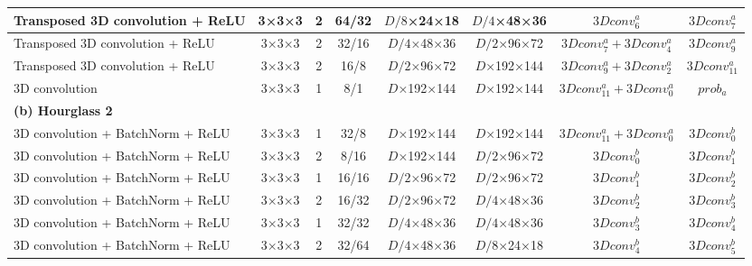 \begin{table}[htbp]
\begin{adjustbox}{width=1\textwidth}
\begin{tabular}{|l|c|c|c|c|c|c|c|}
Transposed 3D convolution + ReLU                  & 3×3×3             & 2               & 64/32          & $D/8$×24×18            & $D/4$×48×36            & $3Dconv^a_6$             & $3Dconv^a_7$          \\ \hline
Transposed 3D convolution + ReLU                 & 3×3×3             & 2               & 32/16        & $D/4$×48×36            & $D/2$×96×72           & $3Dconv^a_7+3Dconv^a_4$             & $3Dconv^a_9$         \\ \hline
Transposed 3D convolution + ReLU                 & 3×3×3             & 2               & 16/8        & $D/2$×96×72           & $D$×192×144           & $3Dconv^a_9+3Dconv^a_2$ & $3Dconv^a_11$          \\ \hline
3D convolution                             & 3×3×3             & 1               & 8/1           & $D$×192×144           & $D$×192×144           & $3Dconv^a_11+3Dconv^a_0$             & $prob_a$           \\ \hline
\rowcolor{bgcolor}
\textbf{(b) Hourglass 2} &                 &                 &                 &                 &                 &                    &                 \\ \hline
3D convolution + BatchNorm + ReLU                            & 3×3×3             & 1               & 32/8         & $D$×192×144           & $D$×192×144           & $3Dconv^a_11+3Dconv^a_0$             & $3Dconv^b_0$          \\ \hline
3D convolution + BatchNorm + ReLU                             & 3×3×3             & 2               & 8/16         & $D$×192×144           & $D/2$×96×72           & $3Dconv^b_0$             & $3Dconv^b_1$          \\ \hline
3D convolution + BatchNorm + ReLU                             & 3×3×3             & 1               & 16/16         & $D/2$×96×72           & $D/2$×96×72           & $3Dconv^b_1$             & $3Dconv^b_2$          \\ \hline
3D convolution + BatchNorm + ReLU                             & 3×3×3             & 2               & 16/32         & $D/2$×96×72           & $D/4$×48×36           & $3Dconv^b_2$             & $3Dconv^b_3$          \\ \hline
3D convolution + BatchNorm + ReLU                             & 3×3×3             & 1               & 32/32         & $D/4$×48×36           & $D/4$×48×36            & $3Dconv^b_3$             & $3Dconv^b_4$          \\ \hline
3D convolution + BatchNorm + ReLU                             & 3×3×3             & 2               & 32/64        & $D/4$×48×36            & $D/8$×24×18             & $3Dconv^b_4$            & $3Dconv^b_5$          \\ \hline

\end{tabular}
\end{adjustbox}
\end{table}
